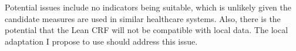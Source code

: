 Potential issues include no indicators being suitable, which is unlikely given the candidate measures are used in similar healthcare systems. Also, there is the potential that the Lean CRF will not be compatible with local data. The local adaptation I propose to use should address this issue.




